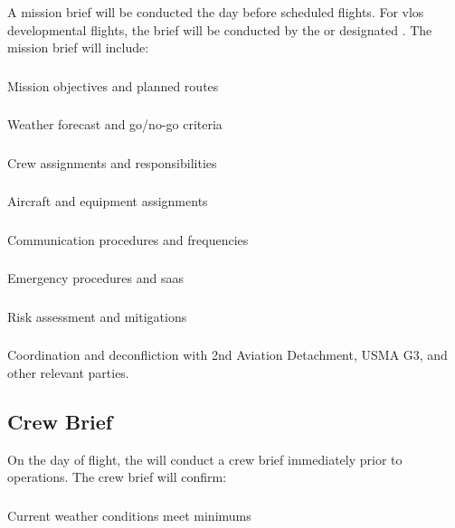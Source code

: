         A mission brief will be conducted the day before scheduled flights. For \ac{vlos} developmental flights, the brief will be conducted by the  or designated . The mission brief will include:

        \subsubsection{} Mission objectives and planned routes
        \subsubsection{} Weather forecast and go/no-go criteria
        \subsubsection{} Crew assignments and responsibilities
        \subsubsection{} Aircraft and equipment assignments
        \subsubsection{} Communication procedures and frequencies
        \subsubsection{} Emergency procedures and \acp{saa}
        \subsubsection{} Risk assessment and mitigations
        \subsubsection{} Coordination and deconfliction with 2nd Aviation Detachment, USMA G3, and other relevant parties.

    \subsection{Crew Brief}\label{ssec:crewbrief}

        On the day of flight, the  will conduct a crew brief immediately prior to operations. The crew brief will confirm:

        \subsubsection{} Current weather conditions meet minimums
